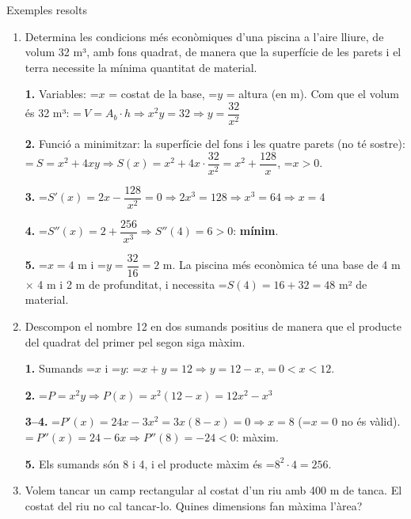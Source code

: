 \documentclass[11pt,a4paper]{article}
\newcommand{\lt}{<}\newcommand{\gt}{>}
\newcommand{\fmm}[1]{\setbox0=\hbox{$#1$}\ifdim\wd0>\linewidth\[#1\]\else\mbox{\box0}\fi}
\begin{document}
  
\begin{fmex}{Exemples resolts}
\begin{enumerate}[label=\textbf{\arabic*.},leftmargin=*]
\item Determina les condicions més econòmiques d'una piscina a l'aire lliure, de volum 32 m³, amb fons quadrat, de manera que la superfície de les parets i el terra necessite la mínima quantitat de material.
          

            

\textbf{1.} Variables: \fmm{x} = costat de la base, \fmm{y} = altura (en m). Com que el volum és 32 m³: \fmm{\ V=A_b\cdot h\Rightarrow x^2y=32\Rightarrow y=\dfrac{32}{x^2}}

            

\textbf{2.} Funció a minimitzar: la superfície del fons i les quatre parets (no té sostre): \fmm{\ S=x^2+4xy\Rightarrow S(x)=x^2+4x\cdot\dfrac{32}{x^2}=x^2+\dfrac{128}{x}}, \fmm{x\gt0}.

            

\textbf{3.} \fmm{S'(x)=2x-\dfrac{128}{x^2}=0\Rightarrow 2x^3=128\Rightarrow x^3=64\Rightarrow x=4}

            

\textbf{4.} \fmm{S''(x)=2+\dfrac{256}{x^3}\Rightarrow S''(4)=6\gt0}: \textbf{mínim}.

            

\textbf{5.} \fmm{x=4} m i \fmm{y=\dfrac{32}{16}=2} m. La piscina més econòmica té una base de 4 m $\times$ 4 m i 2 m de profunditat, i necessita \fmm{S(4)=16+32=48} m² de material.
\item Descompon el nombre 12 en dos sumands positius de manera que el producte del quadrat del primer pel segon siga màxim.
          

            

\textbf{1.} Sumands \fmm{x} i \fmm{y}: \fmm{x+y=12\Rightarrow y=12-x}, \fmm{\ 0\lt x\lt12}.

            

\textbf{2.} \fmm{P=x^2y\Rightarrow P(x)=x^2(12-x)=12x^2-x^3}

            

\textbf{3--4.} \fmm{P'(x)=24x-3x^2=3x(8-x)=0\Rightarrow x=8} (\fmm{x=0} no és vàlid). \fmm{\ P''(x)=24-6x\Rightarrow P''(8)=-24\lt0}: màxim.

            

\textbf{5.} Els sumands són 8 i 4, i el producte màxim és \fmm{8^2\cdot4=256}.
\item Volem tancar un camp rectangular al costat d'un riu amb 400 m de tanca. El costat del riu no cal tancar-lo. Quines dimensions fan màxima l'àrea?
          


\end{enumerate}
\end{fmex}
\end{document}
